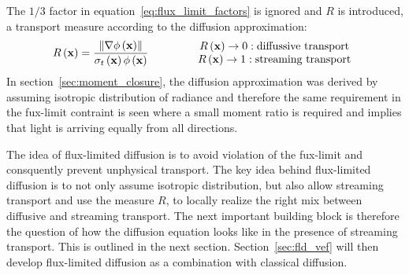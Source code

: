 The $1/3$ factor in equation~\ref{eq:flux_limit_factors} is ignored and $R$ is introduced, a transport measure according to the diffusion approximation:
\begin{align}
\label{eq:fld_transport_measure_R}
R\left(\boldsymbol{\mathbf{x}}\right)
= 
\frac{\left\lVert\nabla\phi\left(\boldsymbol{\mathbf{x}}\right)\right\rVert}{\sigma_t\left(\boldsymbol{\mathbf{x}}\right)\phi\left(\boldsymbol{\mathbf{x}}\right)}
\qquad
\qquad
\begin{array}{cc}
R\left(\boldsymbol{\mathbf{x}}\right)\rightarrow 0 : \text{diffussive transport}\\
R\left(\boldsymbol{\mathbf{x}}\right)\rightarrow 1 : \text{streaming transport}
\end{array}
\end{align}
In section~\ref{sec:moment_closure}, the diffusion approximation was derived by assuming isotropic distribution of radiance and therefore the same requirement in the fux-limit contraint is seen where a small moment ratio is required and implies that light is arriving equally from all directions.

The idea of flux-limited diffusion is to avoid violation of the fux-limit and consquently prevent unphysical transport. The key idea behind flux-limited diffusion is to not only assume isotropic distribution, but also allow streaming transport and use the measure $R$, to locally realize the right mix between diffusive and streaming transport. The next important building block is therefore the question of how the diffusion equation looks like in the presence of streaming transport. This is outlined in the next section. Section~\ref{sec:fld_vef} will then develop flux-limited diffusion as a combination with classical diffusion.
